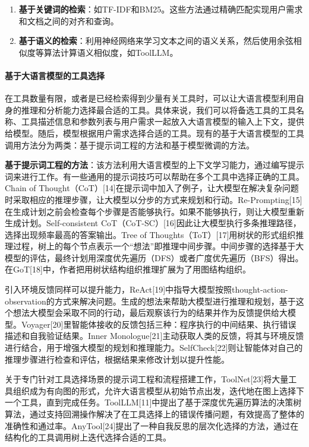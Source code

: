 \begin{enumerate}
    \item \textbf{基于关键词的检索}：如TF-IDF\cite{sparck1972statistical}和BM25\cite{Robertson2009}。这些方法通过精确匹配实现用户需求和文档之间的对齐和查询。
    \item \textbf{基于语义的检索}：利用神经网络来学习文本之间的语义关系，然后使用余弦相似度等算法计算语义相似度，如ToolLLM\cite{Qin2023}。
\end{enumerate}

\paragraph{基于大语言模型的工具选择} 

在工具数量有限，或者是已经检索得到少量有关工具时，可以让大语言模型利用自身的推理和分析能力选择最合适的工具。具体来说，我们可以将备选工具的工具名称、工具描述信息和参数列表与用户需求一起放入大语言模型的输入上下文，提供给模型。随后，模型根据用户需求选择合适的工具。现有的基于大语言模型的工具调用方法分为两类：基于提示词工程的方法和基于模型微调的方法。

\textbf{基于提示词工程的方法}：该方法利用大语言模型的上下文学习能力，通过编写提示词来进行工作。有一些通用的提示词技巧可以帮助在多个工具中选择正确的工具。Chain of Thought（CoT）[14]在提示词中加入了例子，让大模型在解决复杂问题时采取相应的推理步骤，让大模型以分步的方式来规划和行动。Re-Prompting[15]在生成计划之前会检查每个步骤是否能够执行。如果不能够执行，则让大模型重新生成计划。Self-consistent CoT（CoT-SC）[16]因此让大模型执行多条推理路径，选择出现频率最高的答案输出。Tree of Thoughts（ToT）[17]用树状的形式组织推理过程，树上的每个节点表示一个“想法”即推理中间步骤。中间步骤的选择基于大模型的评估，最终计划用深度优先遍历（DFS）或者广度优先遍历（BFS）得出。在GoT[18]中，作者把用树状结构组织推理扩展为了用图结构组织。

引入环境反馈同样可以提升能力，ReAct[19]中指导大模型按照thought-action-observation的方式来解决问题。生成的想法来帮助大模型进行推理和规划，基于这个想法大模型会采取不同的行动，最后观察该行为的结果并作为反馈提供给大模型。Voyager[20]里智能体接收的反馈包括三种：程序执行的中间结果、执行错误描述和自我验证结果。Inner Monologue[21]主动获取人类的反馈，将其与环境反馈进行结合，用于增强大模型的规划和推理能力。SelfCheck[22]则让智能体对自己的推理步骤进行检查和评估，根据结果来修改计划以提升性能。

关于专门针对工具选择场景的提示词工程和流程搭建工作，ToolNet[23]将大量工具组织成为有向图的形式，允许大语言模型从初始节点出发，迭代地在图上选择下一个工具，直到完成任务。ToolLLM[11]中提出了基于深度优先遍历算法的决策树算法，通过支持回溯操作解决了在工具选择上的错误传播问题，有效提高了整体的准确性和通过率。AnyTool[24]提出了一种自我反思的层次化选择的方法，通过在结构化的工具调用树上迭代选择合适的工具。

